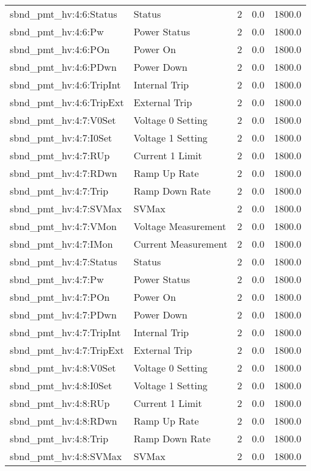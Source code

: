 \begin{center}
\begin{longtable}{l | l l l l }
sbnd\_pmt\_hv:4:6:Status & Status & 2 & 0.0 & 1800.0\\ 
sbnd\_pmt\_hv:4:6:Pw & Power Status & 2 & 0.0 & 1800.0\\ 
sbnd\_pmt\_hv:4:6:POn & Power On & 2 & 0.0 & 1800.0\\ 
sbnd\_pmt\_hv:4:6:PDwn & Power Down & 2 & 0.0 & 1800.0\\ 
sbnd\_pmt\_hv:4:6:TripInt & Internal Trip & 2 & 0.0 & 1800.0\\ 
sbnd\_pmt\_hv:4:6:TripExt & External Trip & 2 & 0.0 & 1800.0\\ 
sbnd\_pmt\_hv:4:7:V0Set & Voltage 0 Setting & 2 & 0.0 & 1800.0\\ 
sbnd\_pmt\_hv:4:7:I0Set & Voltage 1 Setting & 2 & 0.0 & 1800.0\\ 
sbnd\_pmt\_hv:4:7:RUp & Current 1 Limit & 2 & 0.0 & 1800.0\\ 
sbnd\_pmt\_hv:4:7:RDwn & Ramp Up Rate & 2 & 0.0 & 1800.0\\ 
sbnd\_pmt\_hv:4:7:Trip & Ramp Down Rate & 2 & 0.0 & 1800.0\\ 
sbnd\_pmt\_hv:4:7:SVMax & SVMax & 2 & 0.0 & 1800.0\\ 
sbnd\_pmt\_hv:4:7:VMon & Voltage Measurement & 2 & 0.0 & 1800.0\\ 
sbnd\_pmt\_hv:4:7:IMon & Current Measurement & 2 & 0.0 & 1800.0\\ 
sbnd\_pmt\_hv:4:7:Status & Status & 2 & 0.0 & 1800.0\\ 
sbnd\_pmt\_hv:4:7:Pw & Power Status & 2 & 0.0 & 1800.0\\ 
sbnd\_pmt\_hv:4:7:POn & Power On & 2 & 0.0 & 1800.0\\ 
sbnd\_pmt\_hv:4:7:PDwn & Power Down & 2 & 0.0 & 1800.0\\ 
sbnd\_pmt\_hv:4:7:TripInt & Internal Trip & 2 & 0.0 & 1800.0\\ 
sbnd\_pmt\_hv:4:7:TripExt & External Trip & 2 & 0.0 & 1800.0\\ 
sbnd\_pmt\_hv:4:8:V0Set & Voltage 0 Setting & 2 & 0.0 & 1800.0\\ 
sbnd\_pmt\_hv:4:8:I0Set & Voltage 1 Setting & 2 & 0.0 & 1800.0\\ 
sbnd\_pmt\_hv:4:8:RUp & Current 1 Limit & 2 & 0.0 & 1800.0\\ 
sbnd\_pmt\_hv:4:8:RDwn & Ramp Up Rate & 2 & 0.0 & 1800.0\\ 
sbnd\_pmt\_hv:4:8:Trip & Ramp Down Rate & 2 & 0.0 & 1800.0\\ 
sbnd\_pmt\_hv:4:8:SVMax & SVMax & 2 & 0.0 & 1800.0\\ 

\end{longtable}
\end{center}
